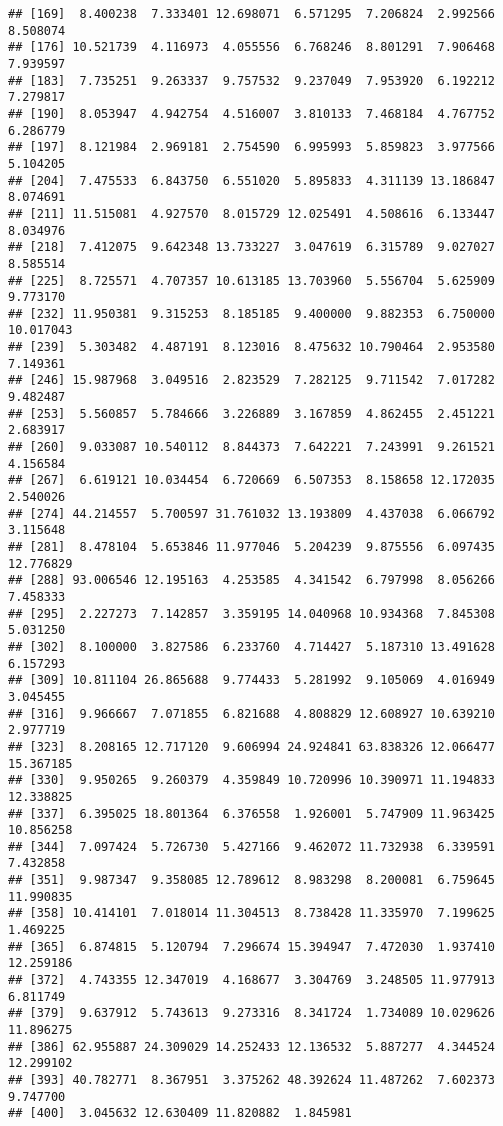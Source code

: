 \documentclass[
]{article}
\begin{document}
\begin{verbatim}
## [169]  8.400238  7.333401 12.698071  6.571295  7.206824  2.992566  8.508074
## [176] 10.521739  4.116973  4.055556  6.768246  8.801291  7.906468  7.939597
## [183]  7.735251  9.263337  9.757532  9.237049  7.953920  6.192212  7.279817
## [190]  8.053947  4.942754  4.516007  3.810133  7.468184  4.767752  6.286779
## [197]  8.121984  2.969181  2.754590  6.995993  5.859823  3.977566  5.104205
## [204]  7.475533  6.843750  6.551020  5.895833  4.311139 13.186847  8.074691
## [211] 11.515081  4.927570  8.015729 12.025491  4.508616  6.133447  8.034976
## [218]  7.412075  9.642348 13.733227  3.047619  6.315789  9.027027  8.585514
## [225]  8.725571  4.707357 10.613185 13.703960  5.556704  5.625909  9.773170
## [232] 11.950381  9.315253  8.185185  9.400000  9.882353  6.750000 10.017043
## [239]  5.303482  4.487191  8.123016  8.475632 10.790464  2.953580  7.149361
## [246] 15.987968  3.049516  2.823529  7.282125  9.711542  7.017282  9.482487
## [253]  5.560857  5.784666  3.226889  3.167859  4.862455  2.451221  2.683917
## [260]  9.033087 10.540112  8.844373  7.642221  7.243991  9.261521  4.156584
## [267]  6.619121 10.034454  6.720669  6.507353  8.158658 12.172035  2.540026
## [274] 44.214557  5.700597 31.761032 13.193809  4.437038  6.066792  3.115648
## [281]  8.478104  5.653846 11.977046  5.204239  9.875556  6.097435 12.776829
## [288] 93.006546 12.195163  4.253585  4.341542  6.797998  8.056266  7.458333
## [295]  2.227273  7.142857  3.359195 14.040968 10.934368  7.845308  5.031250
## [302]  8.100000  3.827586  6.233760  4.714427  5.187310 13.491628  6.157293
## [309] 10.811104 26.865688  9.774433  5.281992  9.105069  4.016949  3.045455
## [316]  9.966667  7.071855  6.821688  4.808829 12.608927 10.639210  2.977719
## [323]  8.208165 12.717120  9.606994 24.924841 63.838326 12.066477 15.367185
## [330]  9.950265  9.260379  4.359849 10.720996 10.390971 11.194833 12.338825
## [337]  6.395025 18.801364  6.376558  1.926001  5.747909 11.963425 10.856258
## [344]  7.097424  5.726730  5.427166  9.462072 11.732938  6.339591  7.432858
## [351]  9.987347  9.358085 12.789612  8.983298  8.200081  6.759645 11.990835
## [358] 10.414101  7.018014 11.304513  8.738428 11.335970  7.199625  1.469225
## [365]  6.874815  5.120794  7.296674 15.394947  7.472030  1.937410 12.259186
## [372]  4.743355 12.347019  4.168677  3.304769  3.248505 11.977913  6.811749
## [379]  9.637912  5.743613  9.273316  8.341724  1.734089 10.029626 11.896275
## [386] 62.955887 24.309029 14.252433 12.136532  5.887277  4.344524 12.299102
## [393] 40.782771  8.367951  3.375262 48.392624 11.487262  7.602373  9.747700
## [400]  3.045632 12.630409 11.820882  1.845981
\end{verbatim}
\end{document}

